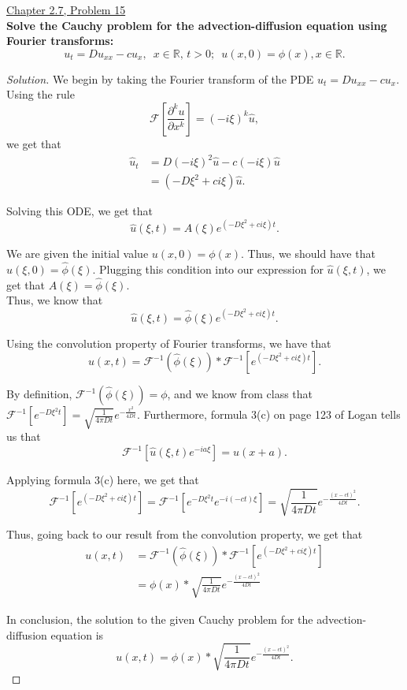 \documentclass[11pt]{article}
\newenvironment{solution}
  {\renewcommand\qedsymbol{$\blacksquare$}\begin{proof}[Solution]}
  {\end{proof}}
\begin{document}
\newpage


\underline{Chapter 2.7, Problem 15} \\

\textbf{Solve the Cauchy problem for the advection-diffusion equation using Fourier transforms:}
\[u_t = Du_{xx} - cu_x, \, \, \, x \in \mathbb{R}, \, t>0; \, \, \, u(x,0)=\phi(x), x\in\mathbb{R}.\]

\begin{solution}
We begin by taking the Fourier transform of the PDE $u_t = Du_{xx} - cu_x.$ Using the rule \[\mathcal{F}\left[ \frac{\partial^k u}{\partial x^k}\right] = (-i\xi)^k \hat{u},\] we get that
\begin{align*} \hat{u}_t &= D(-i\xi)^2 \hat{u} - c(-i\xi) \hat{u} \\
&= (-D\xi^2 + ci\xi) \hat{u}.\end{align*}

Solving this ODE, we get that \[\hat{u}(\xi, t) = A(\xi)e^{(-D\xi^2 + ci\xi)t}.\]

We are given the initial value $u(x, 0) = \phi(x)$. Thus, we should have that $\hat{u}(\xi, 0) = \hat{\phi}(\xi).$ Plugging this condition into our expression for $\hat{u}(\xi, t)$, we get that $A(\xi) = \hat{\phi}(\xi).$ \\

Thus, we know that \[\hat{u}(\xi, t) = \hat{\phi}(\xi)e^{(-D\xi^2 + ci\xi)t}. \]

Using the convolution property of Fourier transforms, we have that
\[ u(x, t) = \mathcal{F}^{-1}\left(\hat{\phi}(\xi)\right) \ast \mathcal{F}^{-1}\left[e^{(-D\xi^2 + ci\xi)t} \right].\]

By definition, $\mathcal{F}^{-1}\left(\hat{\phi}(\xi)\right) = \phi$, and we know from class that $\mathcal{F}^{-1}\left[ e^{-D\xi^2t}\right] = \sqrt{\frac{1}{4\pi Dt}}e^{-\frac{x^2}{4Dt}}.$ Furthermore, formula 3(c) on page 123 of Logan tells us that \[ \mathcal{F}^{-1} \left[ \hat{u}(\xi, t) e^{-ia\xi}\right] = u(x+a) .\]

Applying formula 3(c) here, we get that 
\[\mathcal{F}^{-1}\left[e^{(-D\xi^2 + ci\xi)t} \right] = \mathcal{F}^{-1}\left[e^{-D\xi^2t} e^{-i(-ct)\xi} \right] = \sqrt{\frac{1}{4\pi Dt}}e^{-\frac{(x-ct)^2}{4Dt}} .\]

Thus, going back to our result from the convolution property, we get that
\begin{align*} u(x, t) &= \mathcal{F}^{-1}\left(\hat{\phi}(\xi)\right) \ast \mathcal{F}^{-1}\left[e^{(-D\xi^2 + ci\xi)t} \right] \\
&= \phi(x) \ast \sqrt{\frac{1}{4\pi Dt}}e^{-\frac{(x-ct)^2}{4Dt}}\end{align*}

In conclusion, the solution to the given Cauchy problem for the advection-diffusion equation is
\[ \boxed{u(x, t) =  \phi(x) \ast \sqrt{\frac{1}{4\pi Dt}}e^{-\frac{(x-ct)^2}{4Dt}}}. \] \end{solution}
\end{document}
